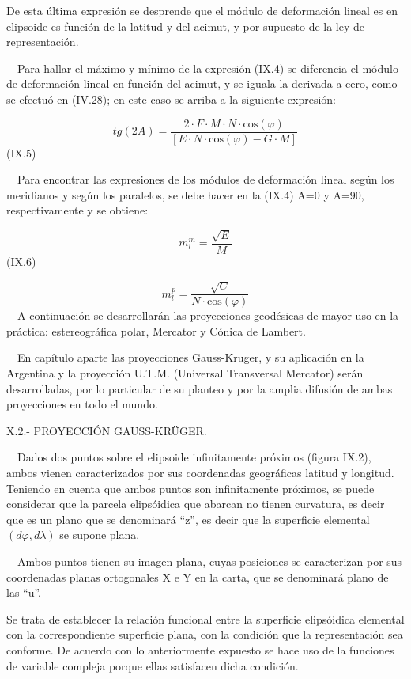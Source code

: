 \documentclass[]{article}
\begin{document}
De esta última expresión se desprende que el módulo de deformación
lineal es en elipsoide es función de la latitud y del acimut, y por
supuesto de la ley de representación.

~~Para hallar el máximo y mínimo de la expresión (IX.4) se diferencia el
módulo de deformación lineal en función del acimut, y se iguala la
derivada a cero, como se efectuó en (IV.28); en este caso se arriba a la
siguiente expresión:

\[{tg\left(2A\right)=\frac{2\cdot F\cdot
M\cdot N\cdot \text{cos}\left(\varphi \right)}{\left[E\cdot N\cdot
\text{cos}\left(\varphi \right)-G\cdot M\right]}}\] (IX.5)

~~Para encontrar las expresiones de los módulos de deformación lineal
según los meridianos y según los paralelos, se debe hacer en la (IX.4)
A=0 y A=90, respectivamente y se obtiene:

\[{m_{{l}}^{{m}}=\frac{\sqrt{E}}{M}}\] (IX.6)

\[{m_{{l}}^{{p}}=\frac{\sqrt{C}}{N\cdot \text{cos}\left(\varphi \right)}}\]
~~A continuación se desarrollarán las proyecciones geodésicas de mayor
uso en la práctica: estereográfica polar, Mercator y Cónica de Lambert.

~~En capítulo aparte las proyecciones Gauss-Kruger, y su aplicación en
la Argentina y la proyección U.T.M. (Universal Transversal Mercator)
serán desarrolladas, por lo particular de su planteo y por la amplia
difusión de ambas proyecciones en todo el mundo.

X.2.- PROYECCIÓN GAUSS-KRÜGER.

~~Dados dos puntos sobre el elipsoide infinitamente próximos (figura
IX.2), ambos vienen caracterizados por sus coordenadas geográficas
latitud y longitud. Teniendo en cuenta que ambos puntos son
infinitamente próximos, se puede considerar que la parcela elipsóidica
que abarcan no tienen curvatura, es decir que es un plano que se
denominará ``z'', es decir que la superficie elemental \({\left(d\varphi
,d\lambda \right)}\) se supone plana.

~~Ambos puntos tienen su imagen plana, cuyas posiciones se caracterizan
por sus coordenadas planas ortogonales X e Y en la carta, que se
denominará plano de las ``u''.

Se trata de establecer la relación funcional entre la superficie
elipsóidica elemental con la correspondiente superficie plana, con la
condición que la representación sea conforme. De acuerdo con lo
anteriormente expuesto se hace uso de la funciones de variable compleja
porque ellas satisfacen dicha condición.
\end{document}
